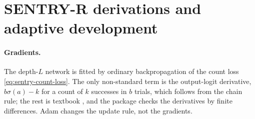 \section{SENTRY-R derivations and adaptive development}\label{app:sentry}

\paragraph{Gradients.} The depth-$L$ network is fitted by ordinary
backpropagation of the count loss \eqref{eq:sentry-count-loss}. The only
non-standard term is the output-logit derivative, $b\sigma(a)-k$ for a count of
$k$ successes in $b$ trials, which follows from the chain rule; the rest is
textbook \citep[ch.~6]{goodfellow2016}, and the package checks the derivatives
by finite differences. Adam changes the update rule, not the gradients.

